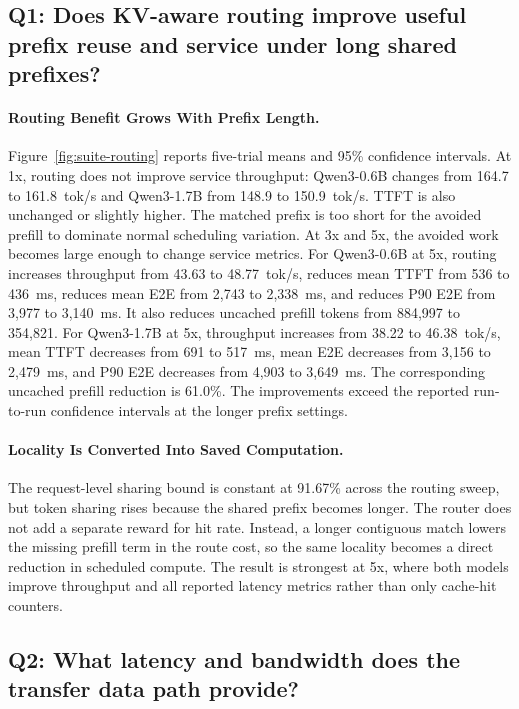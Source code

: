 \documentclass{article}
\begin{document}
\subsection{Q1: Does KV-aware routing improve useful prefix reuse and service under long shared prefixes?}

\paragraph{Routing Benefit Grows With Prefix Length.} Figure~\ref{fig:suite-routing} reports five-trial means and 95\% confidence intervals. At 1x, routing does not improve service throughput: Qwen3-0.6B changes from 164.7 to 161.8~tok/s and Qwen3-1.7B from 148.9 to 150.9~tok/s. TTFT is also unchanged or slightly higher. The matched prefix is too short for the avoided prefill to dominate normal scheduling variation. At 3x and 5x, the avoided work becomes large enough to change service metrics. For Qwen3-0.6B at 5x, routing increases throughput from 43.63 to 48.77~tok/s, reduces mean TTFT from 536 to 436~ms, reduces mean E2E from 2,743 to 2,338~ms, and reduces P90 E2E from 3,977 to 3,140~ms. It also reduces uncached prefill tokens from 884,997 to 354,821. For Qwen3-1.7B at 5x, throughput increases from 38.22 to 46.38~tok/s, mean TTFT decreases from 691 to 517~ms, mean E2E decreases from 3,156 to 2,479~ms, and P90 E2E decreases from 4,903 to 3,649~ms. The corresponding uncached prefill reduction is 61.0\%. The improvements exceed the reported run-to-run confidence intervals at the longer prefix settings.

\paragraph{Locality Is Converted Into Saved Computation.} The request-level sharing bound is constant at 91.67\% across the routing sweep, but token sharing rises because the shared prefix becomes longer. The router does not add a separate reward for hit rate. Instead, a longer contiguous match lowers the missing prefill term in the route cost, so the same locality becomes a direct reduction in scheduled compute. The result is strongest at 5x, where both models improve throughput and all reported latency metrics rather than only cache-hit counters.

\subsection{Q2: What latency and bandwidth does the transfer data path provide?}
\end{document}
